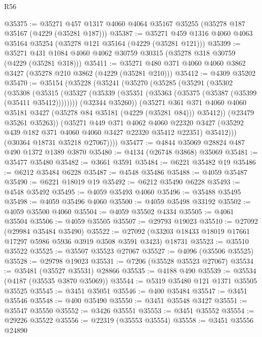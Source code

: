 \begin{lexlean}{R56}
\begin{coremodule}
@35375 := @35271 @457 @1317 @4060 @4064 @35167 @35255 (@35278 @187 @35167 (@4229 (@35281 @187)))
@35387 := @35271 @459 @1316 @4060 @4063 @35164 @35254 (@35278 @121 @35164 (@4229 (@35281 @121)))
@35399 := @35271 @431 @1084 @4060 @4062 @30759 @30315 (@35278 @318 @30759 (@4229 (@35281 @318)))
@35411 := @35271 @480 @371 @4060 @4060 @3862 @3427 (@35278 @210 @3862 (@4229 (@35281 @210)))
@35412 := @4309 @35202
@35470 := @35154
    (@35228
      (@35241
        (@35270
          (@35285
            (@35291
              (@35302
                (@35308
                  (@35315
                    (@35327 (@35339 (@35351 (@35363 (@35375 (@35387 (@35399 (@35411 @35412))))))))
                    (@32344 @35260))
                  (@35271
                    @361
                    @371
                    @4060
                    @4060
                    @35181
                    @3427
                    (@35278 @84 @35181 (@4229 (@35281 @84)))
                    @35412))
                (@23479 @35261 @35263))
              (@35271
                @449
                @371
                @4062
                @4060
                @22320
                @3427
                (@35292 @439 @182 @371 @4060 @4060 @3427 @22320 @35412 @22351)
                @35412)))
          (@30364 @18731 @35218 @27067))))
@35477 := @4844 @35069 @28824 @487 @490 @1372 @1389 @3870
@35480 := @4134 (@26748 @3868) @35069
@35481 := @35477 @35480
@35482 := @3661 @3591
@35484 := @6221 @35482 @19
@35486 := @6212 @35484 @6228
@35487 := @4548 @35486
@35488 := @4059 @35487
@35490 := @6221 @18019 @19
@35492 := @6212 @35490 @6228
@35493 := @4548 @35492
@35495 := @4059 @35493 @4060
@35496 := @35488 @35495
@35498 := @4059 @35496 @4060
@35500 := @4059 @35498 @33192
@35502 := @4059 @35500 @4060
@35504 := @4059 @35502 @4334
@35505 := @4061 @35504
@35506 := @4059 @35505
@35507 := @29793 @19023
@35510 := @27092 (@29984 @35484 @35490)
@35522 := @27092 (@33203 @18433 @18019 @17661 @17297 @5986 @5936 @3919 @3508 @3591 @3423) @18731
@35523 := @35510 @35522
@35525 := @35507 @35523 @27067
@35527 := @4096 (@35506 @35525)
@35528 := @29798 @19023
@35531 := @7206 (@35528 @35523 @27067)
@35534 := @35481 (@35527 @35531) @28866
@35535 := @4188 @490
@35539 := @35534 (@4187 (@35535 @3870 @35069))
@35544 := @5319 @35480 @121 @1371 @35505 @35525
@35545 := @3451 @35051
@35546 := @400 @35484
@35547 := @3451 @35546
@35548 := @400 @35490
@35550 := @3451 @35548 @3427
@35551 := @35547 @35550
@35552 := @3426 @35551
@35553 := @3451 @35552
@35554 := @29226 @35522
@35556 := @22319 (@35553 @35554)
@35558 := @3451 @35556 @24890

\end{coremodule}
\end{lexlean}

